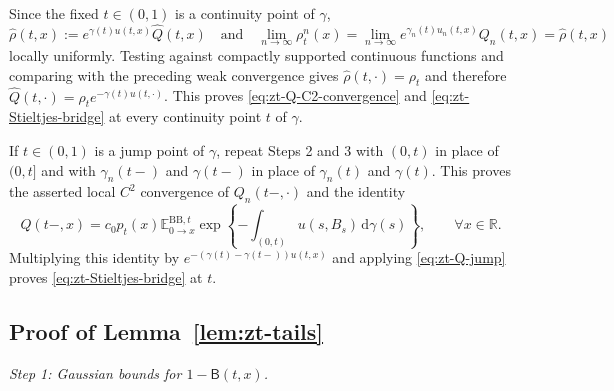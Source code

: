 \documentclass[10pt]{amsart}
\theoremstyle{definition}
\theoremstyle{remark}
\numberwithin{equation}{section}
\newcommand{\R}{\mathbb R}
\newcommand{\E}{\mathbb E}
\newcommand{\1}{\mathbf 1}
\begin{document}
Since the fixed $t\in(0,1)$ is a continuity point of $\gamma$,
\begin{equation*}
 \widehat\rho(t,x):=e^{\gamma(t)u(t,x)}\widehat Q(t,x)
 \quad\text{and}\quad
 \lim_{n\to\infty}\rho_t^n(x)
 =\lim_{n\to\infty}e^{\gamma_n(t)u_n(t,x)}Q_n(t,x)
 =\widehat\rho(t,x)
\end{equation*}
locally uniformly. Testing against compactly supported continuous functions and comparing with the preceding weak convergence gives $\widehat\rho(t,\cdot)=\rho_t$ and therefore $\widehat Q(t,\cdot)=\rho_te^{-\gamma(t)u(t,\cdot)}$. This proves \eqref{eq:zt-Q-C2-convergence} and \eqref{eq:zt-Stieltjes-bridge} at every continuity point $t$ of $\gamma$.

If $t\in(0,1)$ is a jump point of $\gamma$, repeat Steps 2 and 3 with $(0,t)$ in place of $(0,t]$ and with $\gamma_n(t-)$ and $\gamma(t-)$ in place of $\gamma_n(t)$ and $\gamma(t)$. This proves the asserted local $C^2$ convergence of $Q_n(t-,\cdot)$ and the identity
\begin{equation*}
 Q(t-,x)=c_0p_t(x)\E_{0\to x}^{\mathrm{BB},t}
 \exp\left\{-\int_{(0,t)}u(s,B_s)\,\mathrm d\gamma(s)\right\},
 \qquad \forall x\in\R.
\end{equation*}
Multiplying this identity by $e^{-(\gamma(t)-\gamma(t-))u(t,x)}$ and applying \eqref{eq:zt-Q-jump} proves \eqref{eq:zt-Stieltjes-bridge} at $t$.

\subsection{Proof of Lemma~\ref{lem:zt-tails}}\label{a.pf.lem:zt-tails}

\noindent\emph{Step 1: Gaussian bounds for $1-\mathsf B(t,x)$.}
\end{document}
